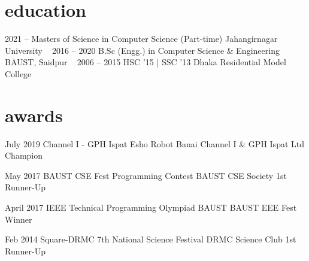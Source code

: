 \section{education}
\begin{entrylist}
	\entry
	{2021 --}
	{Masters of Science {\normalfont in Computer Science (Part-time)}}
	{Jahangirnagar University}
	~
	\entry
	{2016 -- 2020}
	{B.Sc (Engg.) {\normalfont in Computer Science \& Engineering}}
	{BAUST, Saidpur}
	~
	\entry
	{2006 -- 2015}
	{HSC {\normalfont '15} | SSC {\normalfont '13}}
	{Dhaka Residential Model College}
	~
\end{entrylist}

\section{awards}
\begin{entrylist}
	\entry
	{July 2019}
	{Channel I - GPH Ispat Esho Robot Banai}
	{Channel I \& GPH Ispat Ltd}
	{Champion}

	\entry
	{May 2017}
	{BAUST CSE Fest Programming Contest}
	{BAUST CSE Society}
	{1st Runner-Up}

	\entry
	{April 2017}
	{IEEE Technical Programming Olympiad BAUST}
	{BAUST EEE Fest}
	{Winner}

	\entry
	{Feb 2014}
	{Square-DRMC 7th National Science Festival}
	{DRMC Science Club}
	{1st Runner-Up}
\end{entrylist}